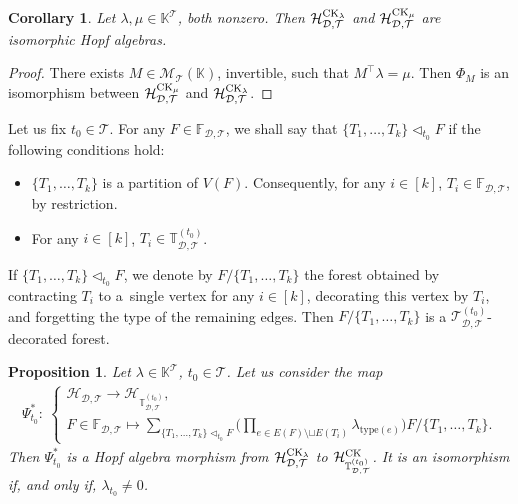 \documentclass[10pt,a4paper]{amsart}
\numberwithin{equation}{section}
\newtheorem{Corollary}[Theorem]{Corollary}
\newtheorem{Proposition}[Theorem]{Proposition}
 { \theoremstyle{definition}
\newtheorem{Definition}[Theorem]{Definition}
\newtheorem{Note}[Theorem]{Note}
\newtheorem{Example}[Theorem]{Example}
\newtheorem{Remark}[Theorem]{Remark}
\newtheorem{Notation}[Theorem]{Notation}}
\newcommand{\K}{\mathbb{K}}
\newcommand{\T}{\mathcal{T}}
\newcommand{\D}{\mathcal{D}}
\newcommand{\h}{\mathcal{H}}
\newcommand{\bfT}{\mathbb{T}}
\newcommand{\bfF}{\mathbb{F}}
\newcommand{\M}{\mathcal{M}}
\newcommand{\type}{\mathrm{type}}
\begin{document}
\begin{Corollary} \label{cor24}
Let $\lambda,\mu \in \K^\T$, both nonzero. Then $\h_{\D,\T}^{{\rm CK}_\lambda}$ and $\h_{\D,\T}^{{\rm CK}_\mu}$
 are isomorphic Hopf algebras.
\end{Corollary}

\begin{proof} There exists $M\in \M_\T(\K)$, invertible, such that $M^\top \lambda=\mu$.
Then $\Phi_M$ is an isomorphism between $\h_{\D,\T}^{{\rm CK}_\mu}$ and $\h_{\D,\T}^{{\rm CK}_\lambda}$. \end{proof}

\begin{Definition}
Let us fix $t_0\in \T$. For any $F \in \bfF_{\D,\T}$, we shall say that $\{T_1,\dots,T_k\}\triangleleft_{t_0} F$
if the following conditions hold:
\begin{itemize}\itemsep=0pt
\item $\{T_1,\dots,T_k\}$ is a partition of $V(F)$. Consequently, for any $i\in [k]$, $T_i\in \bfF_{\D,\T}$,
by restriction.
\item For any $i\in [k]$, $T_i\in \bfT_{\D,\T}^{(t_0)}$.
\end{itemize}
If $\{T_1,\dots,T_k\}\triangleleft_{t_0} F$, we denote by $F/\{T_1,\dots,T_k\}$
the forest obtained by contracting $T_i$ to a~single vertex
for any $i\in [k]$, decorating this vertex by $T_i$, and forgetting the type of the remaining edges.
Then $F/\{T_1,\dots,T_k\}$
is a $\T_{\D,\T}^{(t_0)}$-decorated forest.
\end{Definition}

\begin{Proposition} \label{prop26}
Let $\lambda\in \K^\T$, $t_0\in \T$. Let us consider the map
\begin{gather*}
\Psi_{t_0}^*\colon\ \begin{cases}
\h_{\D,\T} \longrightarrow \h_{\bfT_{\D,\T}^{(t_0)}},
\\
F\in \bfF_{\D,\T} \longmapsto \displaystyle \sum_{\{T_1,\dots,T_k\}\triangleleft_{t_0} F}
\bigg(\prod_{e\in E(F)\setminus \sqcup E(T_i)}\lambda_{\type(e)}\bigg) F/\{T_1,\dots,T_k\}.
\end{cases}
\end{gather*}
Then $\Psi_{t_0}^*$ is a Hopf algebra morphism from $\h_{\D,\T}^{{\rm CK}_\lambda}$ to $\h_{\bfT_{\D,\T}^{(t_0)}}^{{\rm CK}}$.
It is an isomorphism if, and only if, $\lambda_{t_0}\neq 0$.
\end{Proposition}
\end{document}
